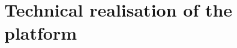 \setcounter{chapter}{3}
\chapter{Technical realisation of the platform}\label{chap:realisation}
\graphicspath{{Chapter4/figures/}}

\pagestyle{fancy}
\fancyhf{}
\fancyhead[R]{\bfseries\rightmark}
\fancyfoot[R]{\thepage}
\renewcommand{\headrulewidth}{0.5pt}
\renewcommand{\footrulewidth}{0pt}
\renewcommand{\chaptermark}[1]{\markboth{{\chaptername~\thechapter.\ #1}}{}}
\renewcommand{\sectionmark}[1]{\markright{\thesection~ #1}}

